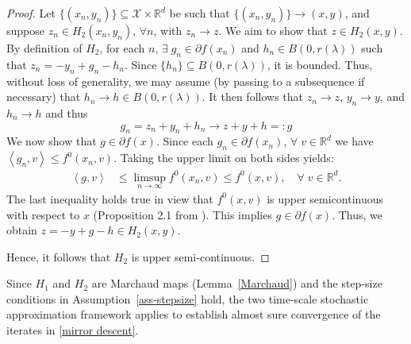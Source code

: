 \documentclass[9pt,journal,twoside,web]{ieeecolor}
\newcommand{\inprod}[2]{\left\langle #1, #2 \right\rangle}
\begin{document}
\begin{proof}
        Let $\{ (x_n ,y_n) \} \subseteq \mathcal{X} \times \mathbb{R}^d$ be such that $\{ (x_n ,y_n) \}  \to (x,y)$,  and suppose $z_n \in H_2(x_n,y_n)$, $\forall n$, with $z_n \to z$. We aim to show that $z \in H_2(x,y)$.
By definition of $H_2$, for each $n$, $\exists \; g_n \in \partial f(x_n)$ and $h_n \in B(0,r(\lambda))$ such that $ z_n = - y_n + g_n - h_n$.
Since  $\{h_n\} \subseteq B (0, r(\lambda))$, it  is bounded. Thus, without loss of generality, we may assume (by passing to a subsequence if necessary) that $h_n \to h \in B(0,r(\lambda))$.  It then follows that $z_n \to z$, $y_n \to y$, and $h_n \to h$ and thus 
\begin{equation*}
    g_n = z_n + y_n + h_n \to z+y+h =: g
\end{equation*}
We now show that $g \in \partial f(x)$. 
\color{black}
Since each $g_n \in \partial f(x_n)$, $\forall \; v \in \mathbb{R}^d$ we have $\inprod{g_n}{v} \leq f^0(x_n,v) $.
Taking the upper limit on both sides yields:
\begin{equation*}
    \begin{split}
         \inprod{g}{v} & \leq \limsup\limits_{n \to \infty} f^0(x_n,v) \leq f^0(x,v), \quad \forall \; v \in \mathbb{R}^d. 
    \end{split}
\end{equation*}
The last inequality holds true in view that $f^0(x,v)$ is upper semicontinuous with respect to $x$ (Proposition 2.1 from \cite{clarke1990optimization}).
 This implies $g \in \partial f(x)$.
\color{black}
Thus,  we obtain $ z = - y + g -h \in H_2(x,y)$.

Hence, it follows that $H_2$ is upper semi-continuous. 
\end{proof}
Since $H_1$ and $H_2$ are Marchaud maps (Lemma~\ref{Marchaud}) and the step-size conditions in Assumption~\ref{ass-stepsize} hold, the two time-scale stochastic approximation framework applies to establish almost sure convergence of the iterates in \eqref{mirror descent}. %
\end{document}
